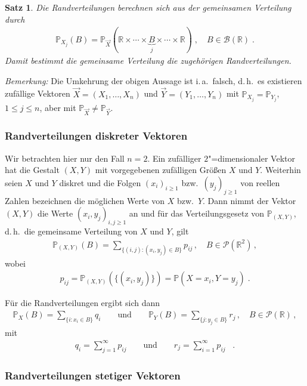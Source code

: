 \documentclass[ngerman,draft,parskip=half,twoside]{scrartcl}
\newtheorem{thm}{Satz}[section]
\newcommand*{\R}{\mathbb{R}}      %
\newcommand*{\BorelM}{\mathcal{B}}  %
\newcommand*{\PotM}{\mathcal{P}}    %
\newcommand*{\WKM}{\mathbb{P}}      %
\begin{document}
\begin{thm}
  Die Randverteilungen berechnen sich aus der gemeinsamen Verteilung durch
  \begin{gather*}
    \WKM_{X_j}(B)
       = \WKM_{\vec X}(\R\times\dotsb\times \underbrace{B}_j
       \times\dotsb\times\R)\;,\quad B\in\BorelM(\R)\;.
  \end{gather*}
  Damit bestimmt die gemeinsame Verteilung die zugehörigen Randverteilungen.
\end{thm}

\textit{Bemerkung:}
Die Umkehrung der obigen Aussage ist i.\,a.~falsch, d.\,h.~es existieren
zufällige Vektoren $\vec X=(X_1,\dotsc,X_n)$ und $\vec Y=(Y_1,\dotsc, Y_n)$ mit
$\WKM_{X_j}=\WKM_{Y_j}$, $1\le j\le n$, aber mit $\WKM_{\vec X}\ne\WKM_{\vec
Y}$.

\subsubsection{Randverteilungen diskreter Vektoren}
\label{disk}

Wir betrachten hier nur den Fall $n=2$. Ein zufälliger $2$"=dimensionaler
Vektor hat die Gestalt $(X,Y)$ mit vorgegebenen zufälligen Größen $X$ und $Y$.
Weiterhin seien $X$ und $Y$ diskret und die Folgen $(x_i)_{i\ge 1}$
bzw.~$(y_j)_{j\ge 1}$ von reellen Zahlen bezeichnen die möglichen Werte von $X$
bzw.~$Y$. Dann nimmt der Vektor $(X,Y)$ die Werte $(x_i,y_j)_{i,j\ge 1}$ an und
für das Verteilungsgesetz von $\WKM_{(X,Y)}$, d.\,h.~die gemeinsame Verteilung
von $X$ und $Y$, gilt
\begin{gather*}
  \WKM_{(X,Y)}(B)
     =\sum_{\{(i,j)\colon (x_i,y_j)\in B\}} p_{ij}\,,\quad B\in\PotM(\R^2)\,,
\end{gather*}
wobei
\begin{gather*}
  p_{ij}= \WKM_{(X,Y)}(\{(x_i,y_j)\})=\WKM(X=x_i,Y=y_j)\;.
\end{gather*}

Für die Randverteilungen ergibt sich dann
\begin{gather*}
  \WKM_X(B)=\sum_{\{i\colon x_i\in B\}} q_i \qquad\mbox{und}\qquad
     \WKM_Y(B)=\sum_{\{j\colon y_j\in B\}} r_j\,,\quad B\in\PotM(\R)\,,
\end{gather*}
mit
\begin{gather*}
  q_i
     =\sum_{j=1}^\infty p_{ij}
     \qquad\mbox{und}\qquad
     r_j=\sum_{i=1}^\infty p_{ij}\;\;\;.
\end{gather*}

\subsubsection{Randverteilungen stetiger Vektoren}
\label{stet}
\end{document}
